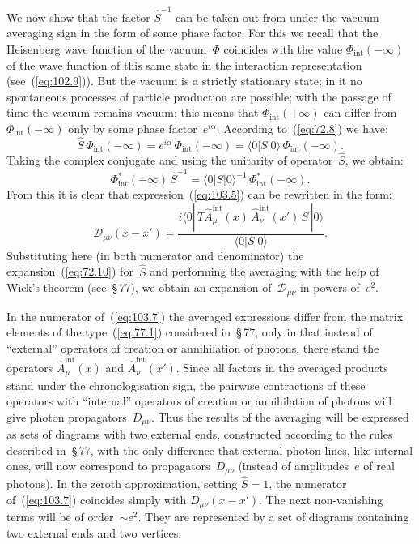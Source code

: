 We now show that the factor $\hat{S}^{-1}$ can be taken out from under the vacuum averaging sign in the form of some phase factor. For this we recall that the Heisenberg wave function of the vacuum~$\Phi$ coincides with the value $\Phi_{\mathrm{int}}(-\infty)$ of the wave function of this same state in the interaction representation (see~(\ref{eq:102.9})). But the vacuum is a strictly stationary state; in it no spontaneous processes of particle production are possible; with the passage of time the vacuum remains vacuum; this means that $\Phi_{\mathrm{int}}(+\infty)$ can differ from $\Phi_{\mathrm{int}}(-\infty)$ only by some phase factor~$e^{i\alpha}$. According to~(\ref{eq:72.8}) we have:
\begin{equation}
\hat{S}\,\Phi_{\mathrm{int}}(-\infty) = e^{i\alpha}\,\Phi_{\mathrm{int}}(-\infty) = \langle 0|S|0\rangle\,\Phi_{\mathrm{int}}(-\infty).
\label{eq:103.6}
\end{equation}
Taking the complex conjugate and using the unitarity of operator~$\hat{S}$, we obtain:
\[
\Phi_{\mathrm{int}}^*(-\infty)\,\hat{S}^{-1} = \langle 0|S|0\rangle^{-1}\,\Phi_{\mathrm{int}}^*(-\infty).
\]
From this it is clear that expression~(\ref{eq:103.5}) can be rewritten in the form:
\begin{equation}
\mathcal{D}_{\mu\nu}(x - x') = \frac{i\langle 0|\,T\hat{A}_{\mu}^{\mathrm{int}}(x)\,\hat{A}_{\nu}^{\mathrm{int}}(x')\,S\,|0\rangle}{\langle 0|S|0\rangle}.
\label{eq:103.7}
\end{equation}
Substituting here (in both numerator and denominator) the expansion~(\ref{eq:72.10}) for~$\hat{S}$ and performing the averaging with the help of Wick's theorem (see~\S\,77), we obtain an expansion of~$\mathcal{D}_{\mu\nu}$ in powers of~$e^2$.

In the numerator of~(\ref{eq:103.7}) the averaged expressions differ from the matrix elements of the type~(\ref{eq:77.1}) considered in~\S\,77, only in that instead of ``external'' operators of creation or annihilation of photons, there stand the operators $\hat{A}_{\mu}^{\mathrm{int}}(x)$ and $\hat{A}_{\nu}^{\mathrm{int}}(x')$. Since all factors in the averaged products stand under the chronologisation sign, the pairwise contractions of these operators with ``internal'' operators of creation or annihilation of photons will give photon propagators~$D_{\mu\nu}$. Thus the results of the averaging will be expressed as sets of diagrams with two external ends, constructed according to the rules described in~\S\,77, with the only difference that external photon lines, like internal ones, will now correspond to propagators~$D_{\mu\nu}$ (instead of amplitudes~$e$ of real photons). In the zeroth approximation, setting $\hat{S} = 1$, the numerator of~(\ref{eq:103.7}) coincides simply with $D_{\mu\nu}(x - x')$. The next non-vanishing terms will be of order~$\sim e^2$. They are represented by a set of diagrams containing two external ends and two vertices:

